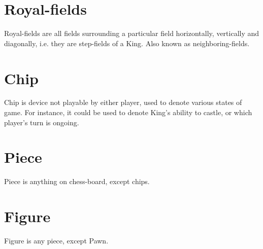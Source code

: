\section*{Royal-fields}
Royal-fields are all fields surrounding a particular field horizontally,
vertically and diagonally, i.e. they are step-fields of a King. Also known
as neighboring-fields.

\section*{Chip}
Chip is device not playable by either player, used to denote various states
of game. For instance, it could be used to denote King's ability to castle,
or which player's turn is ongoing.

\section*{Piece}
Piece is anything on chess-board, except chips.

\section*{Figure}
Figure is any piece, except Pawn.

\clearpage %
